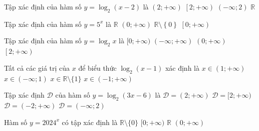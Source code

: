 \begin{ex}%
	Tập  xác định của hàm số $y=\log_2(x-2)$ là
	\choice 
		{\True  $(2;+\infty)$}
		 {$\left[2;\left. +\infty\right)\right.$}
		 {$(-\infty;2)$}
		 {$\mathbb{R}$}
\end{ex}

\begin{ex}%
	Tập xác định của hàm số $y=5^x$ là 
	\choice 
		{\True  $\mathbb{R}$}
		 {$\left(0;+\infty\right)$}
		{$\mathbb{R}\setminus  \left\{0\right\}$}
		 {$\left[0;+\infty\right)$}
\end{ex}

\begin{ex}%
	Tập  xác định của hàm số $y=\log_2x$ là
	 \choice
		{$[0;+\infty)$} 
		 {$(-\infty;+\infty)$}
		{\True  $(0;+\infty)$}
		{$\left[2;+\infty\right)$} 
\end{ex}

\begin{ex}%
	Tất cả  các giá trị của $x$ để biểu thức $\log_2(x-1)$ xác định là
	\choice 
		{\True  $x \in(1;+\infty)$}
		{$x \in(-\infty;  1)$}
		{$x \in \mathbb{R} \setminus\{1\}$} 
		 {$x \in(-1;+\infty)$}
\end{ex}

\begin{ex}%
	Tập xác định $\mathscr{D}$ của hàm số  $y=\log _2(3 x-6)$ là
	\choice 
		 {\True $\mathscr{D}=(2;+\infty)$}
		{$\mathscr{D}=[2;+\infty)$} 
		 {$\mathscr{D}=(-2;+\infty)$}
		{$\mathscr{D}=(-\infty;  2)$}
\end{ex}

\begin{ex}%
	Hàm số $y=2024^x$ có tập xác định  là
	\choice 
		{$\mathbb{R}\setminus  \{0\}$}
		{$[0;+\infty)$} 
		{\True $\mathbb{R}$} 
		 {$(0;+\infty)$}
\end{ex}

